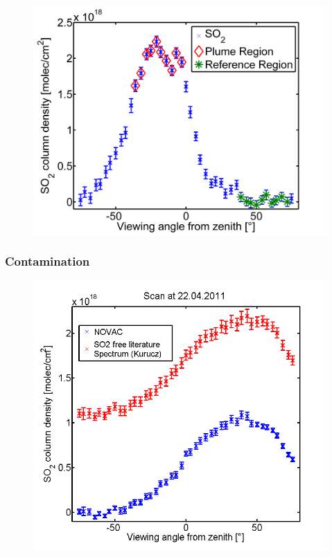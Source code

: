 \documentclass{beamer} %
\begin{document}
\begin{frame}
\begin{multicols}{2}
\begin{figure}
		\includegraphics[width=1\linewidth]{../../Bilder/SO2_Scan}
		\label{fig:dddd}
	\end{figure}	
\end{multicols}
\end{frame}





	
	\begin{frame}
		\frametitle{\color{mygreen}Contamination\\%
		\color{mygreen}{\rule{0.8\textwidth}{2pt}}}
		\begin{figure}
			\centering
			\includegraphics[width=0.7\linewidth]{../../Bilder/contaminated}
			\caption{}
			\label{fig:contaminated}
		\end{figure}
	
	\end{frame}	
	
\end{document}
